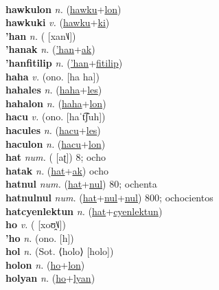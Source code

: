  \label{hawku} \\
\textbf{hawkulon} \textit{n.} (\hyperref[hawku]{hawku}+\hyperref[lon]{lon})
 \label{hawkulon} \\
\textbf{hawkuki} \textit{v.} (\hyperref[hawku]{hawku}+\hyperref[ki]{ki})
 \label{hawkuki} \\
\textbf{'han} \textit{n.} ( [xan˥˩])
 \label{'han} \\
\textbf{'hanak} \textit{n.} (\hyperref['han]{'han}+\hyperref[ak]{ak})
 \label{'hanak} \\
\textbf{'hanfitilip} \textit{n.} (\hyperref['han]{'han}+\hyperref[fitilip]{fitilip})
 \label{'hanfitilip} \\
\textbf{haha} \textit{v.} (ono. [ha ha])
 \label{haha} \\
\textbf{hahales} \textit{n.} (\hyperref[haha]{haha}+\hyperref[les]{les})
 \label{hahales} \\
\textbf{hahalon} \textit{n.} (\hyperref[haha]{haha}+\hyperref[lon]{lon})
 \label{hahalon} \\
\textbf{hacu} \textit{v.} (ono. [haˈt͡ʃuh])
 \label{hacu} \\
\textbf{hacules} \textit{n.} (\hyperref[hacu]{hacu}+\hyperref[les]{les})
 \label{hacules} \\
\textbf{haculon} \textit{n.} (\hyperref[hacu]{hacu}+\hyperref[lon]{lon})
 \label{haculon} \\
\textbf{hat} \textit{num.} ( [aʈ])
8; ocho \label{hat} \\
\textbf{hatak} \textit{n.} (\hyperref[hat]{hat}+\hyperref[ak]{ak})
ocho \label{hatak} \\
\textbf{hatnul} \textit{num.} (\hyperref[hat]{hat}+\hyperref[nul]{nul})
80; ochenta \label{hatnul} \\
\textbf{hatnulnul} \textit{num.} (\hyperref[hat]{hat}+\hyperref[nul]{nul}+\hyperref[nul]{nul})
800; ochocientos \label{hatnulnul} \\
\textbf{hatcyenlektun} \textit{n.} (\hyperref[hat]{hat}+\hyperref[cyenlektun]{cyenlektun})
 \label{hatcyenlektun} \\
\textbf{ho} \textit{v.} ( [xoʊ̯˥˩])
 \label{ho} \\
\textbf{'ho} \textit{n.} (ono. [h])
 \label{'ho} \\
\textbf{hol} \textit{n.} (Sot. ⟨holo⟩ [holo])
 \label{hol} \\
\textbf{holon} \textit{n.} (\hyperref[ho]{ho}+\hyperref[lon]{lon})
 \label{holon} \\
\textbf{holyan} \textit{n.} (\hyperref[ho]{ho}+\hyperref[lyan]{lyan})
